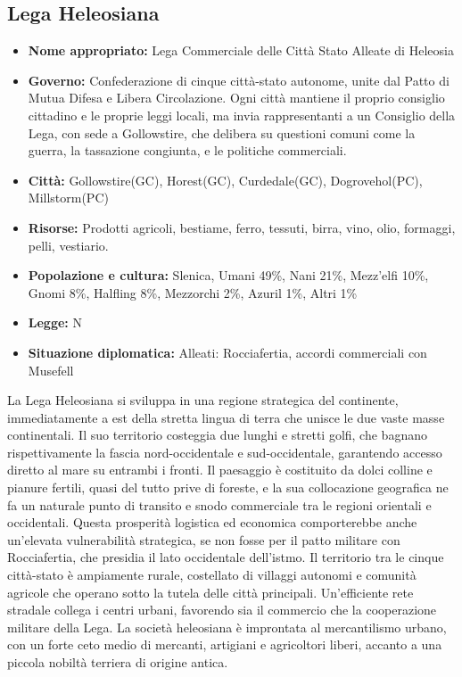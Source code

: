 \documentclass[10pt, a4paper]{report}
\begin{document}
\begin{multicols}{2}
\subsection*{Lega Heleosiana}
\begin{itemize}
	\item \textbf{Nome appropriato:} Lega Commerciale delle Città Stato Alleate di Heleosia 
	\item \textbf{Governo:} Confederazione di cinque città-stato autonome, unite dal Patto di Mutua Difesa e Libera Circolazione. Ogni città mantiene il proprio consiglio cittadino e le proprie leggi locali, ma invia rappresentanti a un Consiglio della Lega, con sede a Gollowstire, che delibera su questioni comuni come la guerra, la tassazione congiunta, e le politiche commerciali.
	\item \textbf{Città:} Gollowstire(GC), Horest(GC), Curdedale(GC), Dogrovehol(PC), Millstorm(PC)
	\item \textbf{Risorse:} Prodotti agricoli, bestiame, ferro, tessuti, birra, vino, olio, formaggi, pelli, vestiario.
	\item \textbf{Popolazione e cultura:} Slenica, Umani 49\%, Nani 21\%, Mezz'elfi 10\%, Gnomi 8\%, Halfling 8\%, Mezzorchi 2\%, Azuril 1\%, Altri 1\% 
	\item \textbf{Legge:} N
	\item \textbf{Situazione diplomatica:} Alleati: Rocciafertia, accordi commerciali con Musefell
\end{itemize}
La Lega Heleosiana si sviluppa in una regione strategica del continente, immediatamente a est della stretta lingua di terra che unisce le due vaste masse continentali. Il suo territorio costeggia due lunghi e stretti golfi, che bagnano rispettivamente la fascia nord-occidentale e sud-occidentale, garantendo accesso diretto al mare su entrambi i fronti. Il paesaggio è costituito da dolci colline e pianure fertili, quasi del tutto prive di foreste, e la sua collocazione geografica ne fa un naturale punto di transito e snodo commerciale tra le regioni orientali e occidentali. Questa prosperità logistica ed economica comporterebbe anche un’elevata vulnerabilità strategica, se non fosse per il patto militare con Rocciafertia, che presidia il lato occidentale dell’istmo.
Il territorio tra le cinque città-stato è ampiamente rurale, costellato di villaggi autonomi e comunità agricole che operano sotto la tutela delle città principali. Un'efficiente rete stradale collega i centri urbani, favorendo sia il commercio che la cooperazione militare della Lega.
La società heleosiana è improntata al mercantilismo urbano, con un forte ceto medio di mercanti, artigiani e agricoltori liberi, accanto a una piccola nobiltà terriera di origine antica.

\end{multicols}
\end{document}
